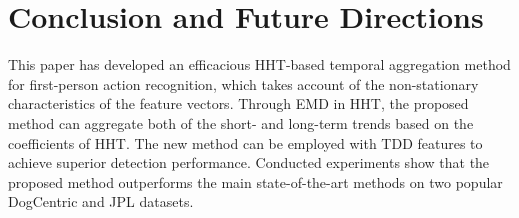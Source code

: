 \newpage
\chapter{Conclusion and Future Directions}
This paper has developed an efficacious HHT-based temporal
aggregation method for first-person action recognition, which takes
account of the non-stationary characteristics of the feature
vectors. Through EMD in HHT, the proposed method can aggregate both
of the short- and long-term trends based on the coefficients of HHT.
The new method can be employed with TDD features to achieve superior
detection performance. Conducted experiments show that the proposed
method outperforms the main state-of-the-art methods  on two popular
DogCentric and JPL datasets.